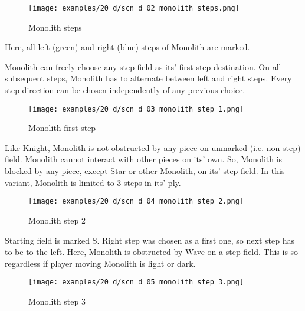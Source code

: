 \vspace*{6.1\baselineskip}
\noindent
\begin{wrapfigure}[9]{l}{0.35\textwidth}
\centering
\texttt{[image: examples/20\_d/scn\_d\_02\_monolith\_steps.png]}
\caption{Monolith steps}
\label{fig:scn_d_02_monolith_steps}
\end{wrapfigure}
Here, all left (green) and right (blue) steps of Monolith are marked.

Monolith can freely choose any step-field as its' first step destination. On all
subsequent steps, Monolith has to alternate between left and right steps. Every
step direction can be chosen independently of any previous choice.

\noindent
\begin{wrapfigure}[9]{l}{0.35\textwidth}
\centering
\texttt{[image: examples/20\_d/scn\_d\_03\_monolith\_step\_1.png]}
\caption{Monolith first step}
\label{fig:scn_d_03_monolith_step_1}
\end{wrapfigure}
Like Knight, Monolith is not obstructed by any piece on unmarked (i.e. non-step)
field. Monolith cannot interact with other pieces on its' own. So, Monolith is
blocked by any piece, except Star or other Monolith, on its' step-field. In this
variant, Monolith is limited to 3 steps in its' ply.

\clearpage %

\noindent
\begin{figure}[!h]
\texttt{[image: examples/20\_d/scn\_d\_04\_monolith\_step\_2.png]}
\caption{Monolith step 2}
\label{fig:scn_d_04_monolith_step_2}
\end{figure}

Starting field is marked S. Right step was chosen as a first one, so next step
has to be to the left. Here, Monolith is obstructed by Wave on a step-field.
This is so regardless if player moving Monolith is light or dark.

\clearpage %

\noindent
\begin{figure}[!h]
\texttt{[image: examples/20\_d/scn\_d\_05\_monolith\_step\_3.png]}
\caption{Monolith step 3}
\label{fig:scn_d_05_monolith_step_3}
\end{figure}


